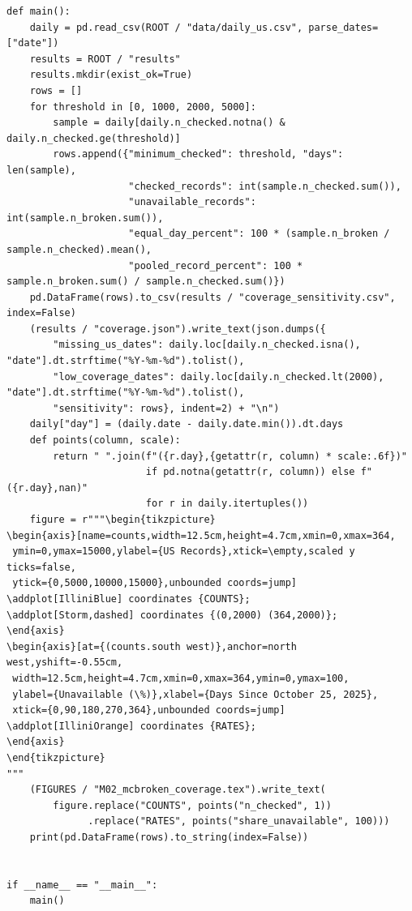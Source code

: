 \begin{Verbatim}[breaklines,breakanywhere,fontsize=\small]
def main():
    daily = pd.read_csv(ROOT / "data/daily_us.csv", parse_dates=["date"])
    results = ROOT / "results"
    results.mkdir(exist_ok=True)
    rows = []
    for threshold in [0, 1000, 2000, 5000]:
        sample = daily[daily.n_checked.notna() & daily.n_checked.ge(threshold)]
        rows.append({"minimum_checked": threshold, "days": len(sample),
                     "checked_records": int(sample.n_checked.sum()),
                     "unavailable_records": int(sample.n_broken.sum()),
                     "equal_day_percent": 100 * (sample.n_broken / sample.n_checked).mean(),
                     "pooled_record_percent": 100 * sample.n_broken.sum() / sample.n_checked.sum()})
    pd.DataFrame(rows).to_csv(results / "coverage_sensitivity.csv", index=False)
    (results / "coverage.json").write_text(json.dumps({
        "missing_us_dates": daily.loc[daily.n_checked.isna(), "date"].dt.strftime("%Y-%m-%d").tolist(),
        "low_coverage_dates": daily.loc[daily.n_checked.lt(2000), "date"].dt.strftime("%Y-%m-%d").tolist(),
        "sensitivity": rows}, indent=2) + "\n")
    daily["day"] = (daily.date - daily.date.min()).dt.days
    def points(column, scale):
        return " ".join(f"({r.day},{getattr(r, column) * scale:.6f})"
                        if pd.notna(getattr(r, column)) else f"({r.day},nan)"
                        for r in daily.itertuples())
    figure = r"""\begin{tikzpicture}
\begin{axis}[name=counts,width=12.5cm,height=4.7cm,xmin=0,xmax=364,
 ymin=0,ymax=15000,ylabel={US Records},xtick=\empty,scaled y ticks=false,
 ytick={0,5000,10000,15000},unbounded coords=jump]
\addplot[IlliniBlue] coordinates {COUNTS};
\addplot[Storm,dashed] coordinates {(0,2000) (364,2000)};
\end{axis}
\begin{axis}[at={(counts.south west)},anchor=north west,yshift=-0.55cm,
 width=12.5cm,height=4.7cm,xmin=0,xmax=364,ymin=0,ymax=100,
 ylabel={Unavailable (\%)},xlabel={Days Since October 25, 2025},
 xtick={0,90,180,270,364},unbounded coords=jump]
\addplot[IlliniOrange] coordinates {RATES};
\end{axis}
\end{tikzpicture}
"""
    (FIGURES / "M02_mcbroken_coverage.tex").write_text(
        figure.replace("COUNTS", points("n_checked", 1))
              .replace("RATES", points("share_unavailable", 100)))
    print(pd.DataFrame(rows).to_string(index=False))


if __name__ == "__main__":
    main()
\end{Verbatim}

